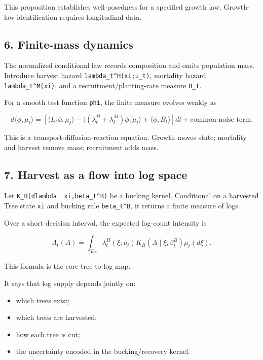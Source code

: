 This proposition establishes well-posedness for a specified growth law. Growth-law
identification requires longitudinal data.

\subsection{6. Finite-mass dynamics}\label{finite-mass-dynamics}

The normalized conditional law records composition and omits population mass.
Introduce harvest hazard \texttt{lambda\_t\^{}H(xi;u\_t)}, mortality hazard \texttt{lambda\_t\^{}M(xi)}, and a
recruitment/planting-rate measure \texttt{B\_t}.

For a smooth test function \texttt{phi}, the finite measure evolves weakly as

\[
d\langle\phi,\mu_t\rangle
=\left[\langle L_t\phi,\mu_t\rangle
-\langle(\lambda_t^H+\lambda_t^M)\phi,\mu_t\rangle
+\langle\phi,B_t\rangle\right]dt
+\text{common-noise term}.
\]

This is a transport-diffusion-reaction equation. Growth moves state; mortality
and harvest remove mass; recruitment adds mass.

\subsection{7. Harvest as a flow into log space}\label{harvest-as-a-flow-into-log-space}

Let \texttt{K\_B(dlambda\ \textbar{}\ xi,beta\_t\^{}B)} be a bucking kernel. Conditional on a harvested
Tree state \texttt{xi} and bucking rule \texttt{beta\_t\^{}B}, it returns a finite measure of logs.

Over a short decision interval, the expected log-count intensity is

\[
\Lambda_t(A)=\int_{E_T}
\lambda_t^H(\xi;u_t)K_B(A\mid\xi,\beta_t^B)\mu_t(d\xi).
\]

This formula is the core tree-to-log map.

It says that log supply depends jointly on:

\begin{itemize}
\tightlist
\item
  which trees exist;
\item
  which trees are harvested;
\item
  how each tree is cut;
\item
  the uncertainty encoded in the bucking/recovery kernel.
\end{itemize}

